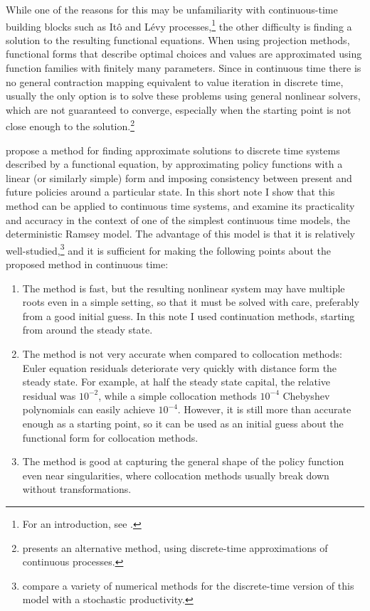 \documentclass[a4paper,11pt]{article}
\begin{document}
While one of the reasons for this may be unfamiliarity with continuous-time building blocks such as Itô and Lévy processes,\footnote{For an introduction, see \textcite{oksendal2005applied}.} the other difficulty is finding a solution to the resulting functional equations. When using projection methods, functional forms that describe optimal choices and values are approximated using function families with finitely many parameters. Since in continuous time there is no general contraction mapping equivalent to value iteration in discrete time, usually the only option is to solve these problems using general nonlinear solvers, which are not guaranteed to converge, especially when the starting point is not close enough to the solution.\footnote{\textcite{kushner2013numerical} presents an alternative method, using discrete-time approximations of continuous processes.}

\textcite{den2015exact} propose a method for finding approximate solutions to discrete time systems described by a functional equation, by approximating policy functions with a linear (or similarly simple) form and imposing consistency between present and future policies around a particular state. In this short note I show that this method can be applied to continuous time systems, and examine its practicality and accuracy in the context of one of the simplest continuous time models, the deterministic Ramsey model. The advantage of this model is that it is relatively well-studied,\footnote{\textcite{aruoba2006comparing} compare a variety of numerical methods for the discrete-time version of this model with a stochastic productivity.} and it is sufficient for making the following points about the proposed method in continuous time:
\begin{enumerate}
\item The method is fast, but the resulting nonlinear system may have multiple roots even in a simple setting, so that it must be solved with care, preferably from a good initial guess. In this note I used continuation methods, starting from around the steady state.
\item The method is not very accurate when compared to collocation methods: Euler equation residuals deteriorate very quickly with distance form the steady state. For example, at half the steady state capital, the relative residual was $10^{-2}$, while a simple collocation methods $10^{-4}$ Chebyshev polynomials can easily achieve $10^{-4}$. However, it is still more than accurate enough as a starting point, so it can be used as an initial guess about the functional form for collocation methods.
\item The method is good at capturing the general shape of the policy function even near singularities, where collocation methods usually break down without transformations.
\end{enumerate}
\end{document}
